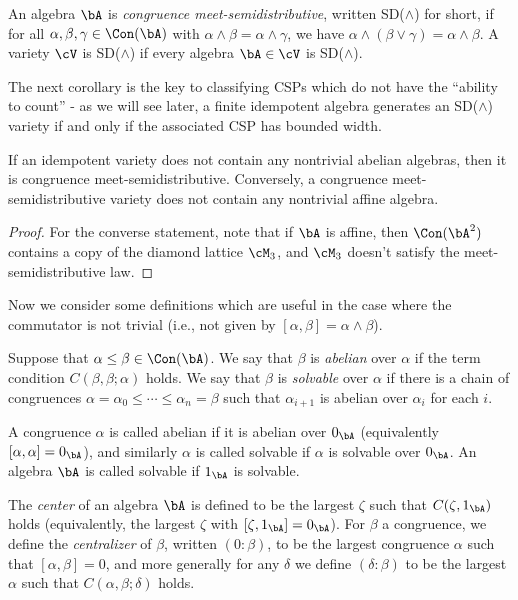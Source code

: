 \begin{defn} An algebra $\bA$ is \emph{congruence meet-semidistributive}, written SD($\wedge$) for short, if for all $\alpha,\beta,\gamma \in \Con(\bA)$ with $\alpha \wedge \beta = \alpha\wedge \gamma$, we have $\alpha \wedge (\beta \vee \gamma) = \alpha \wedge \beta$. A variety $\cV$ is SD($\wedge$) if every algebra $\bA \in \cV$ is SD($\wedge$).
\end{defn}

The next corollary is the key to classifying CSPs which do not have the ``ability to count'' - as we will see later, a finite idempotent algebra generates an SD($\wedge$) variety if and only if the associated CSP has bounded width.

\begin{cor}\label{cor-sd-meet} If an idempotent variety does not contain any nontrivial abelian algebras, then it is congruence meet-semidistributive. Conversely, a congruence meet-semidistributive variety does not contain any nontrivial affine algebra.
\end{cor}
\begin{proof} For the converse statement, note that if $\bA$ is affine, then $\Con(\bA^2)$ contains a copy of the diamond lattice $\cM_3$, and $\cM_3$ doesn't satisfy the meet-semidistributive law.
\end{proof}

Now we consider some definitions which are useful in the case where the commutator is not trivial (i.e., not given by $[\alpha,\beta] = \alpha \wedge \beta$).

\begin{defn} Suppose that $\alpha \le \beta \in \Con(\bA)$. We say that $\beta$ is \emph{abelian} over $\alpha$ if the term condition $C(\beta,\beta;\alpha)$ holds. We say that $\beta$ is \emph{solvable} over $\alpha$ if there is a chain of congruences $\alpha = \alpha_0 \le \cdots \le \alpha_n = \beta$ such that $\alpha_{i+1}$ is abelian over $\alpha_i$ for each $i$.

A congruence $\alpha$ is called abelian if it is abelian over $0_\bA$ (equivalently $[\alpha,\alpha] = 0_\bA$), and similarly $\alpha$ is called solvable if $\alpha$ is solvable over $0_\bA$. An algebra $\bA$ is called solvable if $1_\bA$ is solvable.

The \emph{center} of an algebra $\bA$ is defined to be the largest $\zeta$ such that $C(\zeta,1_\bA)$ holds (equivalently, the largest $\zeta$ with $[\zeta, 1_\bA] = 0_\bA$). For $\beta$ a congruence, we define the \emph{centralizer} of $\beta$, written $(0:\beta)$, to be the largest congruence $\alpha$ such that $[\alpha,\beta] = 0$, and more generally for any $\delta$ we define $(\delta:\beta)$ to be the largest $\alpha$ such that $C(\alpha,\beta;\delta)$ holds.
\end{defn}

